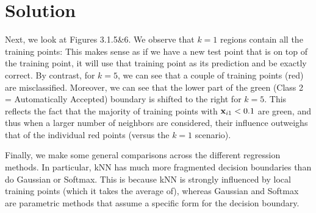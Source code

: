 \documentclass[submit]{../harvardml}
\newenvironment{solution}
  {\color{blue}\section*{Solution}}
{}
\begin{document}
\begin{solution}
\begin{enumerate}
    \vspace{.5em}
    Next, we look at Figures 3.1.5\&6. We observe that $k=1$ regions contain all the training points: This makes sense as if we have a new test point that is on top of the training point, it will use that training point as its prediction and be exactly correct. By contrast, for $k=5$, we can see that a couple of training points (red) are misclassified. Moreover, we can see that the lower part of the green (Class 2 = Automatically Accepted) boundary is shifted to the right for $k=5$. This reflects the fact that the majority of training points with $\mathbf{x}_{i1} < 0.1$ are green, and thus when a larger number of neighbors are considered, their influence outweighs that of the individual red points (versus the $k=1$ scenario). 

    \vspace{.5em}
    Finally, we make some general comparisons across the different regression methods. In particular, kNN has much more fragmented decision boundaries than do Gaussian or Softmax. This is because kNN is strongly influenced by local training points (which it takes the average of), whereas Gaussian and Softmax are parametric methods that assume a specific form for the decision boundary.


\end{enumerate}
\end{solution}
\end{document}
